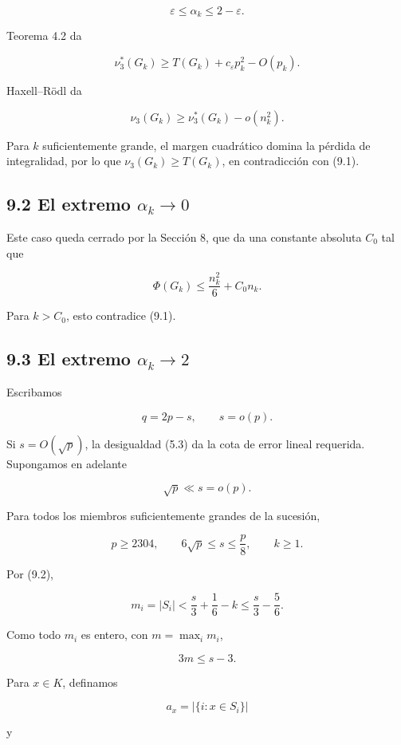 \documentclass[
  spanish,
  11pt,
  a4paper,
]{article}
\begin{document}
\[
\varepsilon\le\alpha_k\le2-\varepsilon.
\]

Teorema 4.2 da

\[
\nu_3^*(G_k)
\ge
T(G_k)+c_\varepsilon p_k^2-O(p_k).
\]

Haxell--Rödl da

\[
\nu_3(G_k)
\ge
\nu_3^*(G_k)-o(n_k^2).
\]

Para \(k\) suficientemente grande, el margen cuadrático domina la pérdida de integralidad, por lo que \(\nu_3(G_k)\ge T(G_k)\), en contradicción con (9.1).

\subsection{\texorpdfstring{9.2 El extremo \(\alpha_k\to0\)}{9.2 El extremo \textbackslash alpha\_k\textbackslash to0}}\label{el-extremo-alpha_kto0}

Este caso queda cerrado por la Sección 8, que da una constante absoluta \(C_0\) tal que

\[
\Phi(G_k)
\le
\frac{n_k^2}{6}+C_0n_k.
\]

Para \(k>C_0\), esto contradice (9.1).

\subsection{\texorpdfstring{9.3 El extremo \(\alpha_k\to2\)}{9.3 El extremo \textbackslash alpha\_k\textbackslash to2}}\label{el-extremo-alpha_kto2}

Escribamos

\[
q=2p-s,
\qquad
s=o(p).
\]

Si \(s=O(\sqrt p)\), la desigualdad (5.3) da la cota de error lineal requerida. Supongamos en adelante

\[
\sqrt p\ll s=o(p).
\tag{9.3}
\]

Para todos los miembros suficientemente grandes de la sucesión,

\[
p\ge2304,
\qquad
6\sqrt p\le s\le\frac p8,
\qquad
k\ge1.
\tag{9.4}
\]

Por (9.2),

\[
m_i=|S_i|
<
\frac s3+\frac16-k
\le
\frac s3-\frac56.
\]

Como todo \(m_i\) es entero, con \(m=\max_i m_i\),

\[
\boxed{3m\le s-3.}
\tag{9.5}
\]

Para \(x\in K\), definamos

\[
a_x=|\{i:x\in S_i\}|
\]

y
\end{document}
